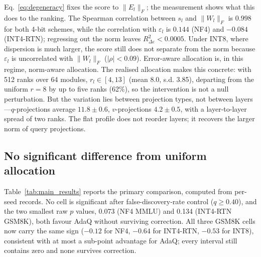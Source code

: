 \documentclass[preprint,12pt]{elsarticle}
\begin{document}
Eq.~\eqref{eq:degeneracy} fixes the score to $\|E_l\|_F$; the measurement shows what this does to the ranking. The Spearman correlation between $s_l$ and $\|W_l\|_F$ is $0.998$ for both 4-bit schemes, while the correlation with $\varepsilon_l$ is $0.144$ (NF4) and $-0.084$ (INT4-RTN); regressing out the norm leaves $R^2_{\Delta\varepsilon} < 0.0005$. Under INT8, where dispersion is much larger, the score still does not separate from the norm because $\varepsilon_l$ is uncorrelated with $\|W_l\|_F$ ($|\rho| < 0.09$). Error-aware allocation is, in this regime, norm-aware allocation.
The realised allocation makes this concrete: with 512 ranks over 64 modules, $r_l \in [4,13]$ (mean 8.0, s.d. 3.85), departing from the uniform $r=8$ by up to five ranks (62\%), so the intervention is not a null perturbation. But the variation lies between projection types, not between layers---$q$-projections average $11.8 \pm 0.6$, $v$-projections $4.2 \pm 0.5$, with a layer-to-layer spread of two ranks. The flat profile does not reorder layers; it recovers the larger norm of query projections.

\subsection{No significant difference from uniform allocation}
\label{sec:main}

Table~\ref{tab:main_results} reports the primary comparison, computed from per-seed records. No cell is significant after false-discovery-rate control ($q \geq 0.40$), and the two smallest raw $p$ values, 0.073 (NF4 MMLU) and 0.134 (INT4-RTN GSM8K), both favour AdaQ without surviving correction. All three GSM8K cells now carry the same sign ($-0.12$ for NF4, $-0.64$ for INT4-RTN, $-0.53$ for INT8), consistent with at most a sub-point advantage for AdaQ; every interval still contains zero and none survives correction.
\end{document}
